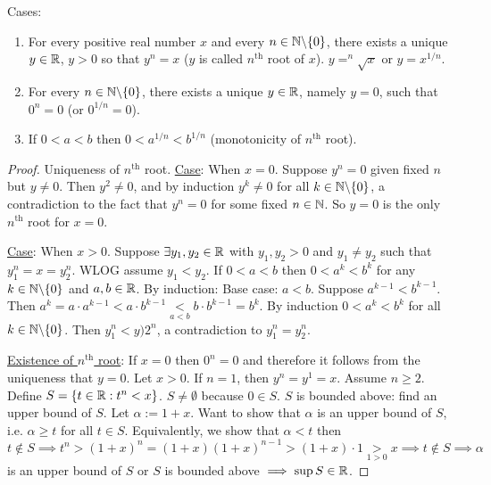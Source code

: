 \documentclass[]{article}
\begin{document}
\begin{theorem}
	Cases:
	\label{thm1.21}
	\begin{enumerate}
		\item For every positive real number $x$ and every $n\in\mathbb{N}\backslash \{0\}$, there exists a unique $y\in\mathbb{R}$, $y>0$ so that $y^n = x$ ($y$ is called $n^\text{th}$ root of $x$). $y = ^n\sqrt{x}$ or $y = x^{1/n}$.
		\item For every $n\in\mathbb{N}\backslash \{0\}$, there exists a unique $y\in\mathbb{R}$, namely \ul{$y=0$}, such that $0^n = 0$ (or $0^{1/n} = 0$).
		\item If $0<a<b$ then $0<a^{1/n} < b^{1/n}$ (monotonicity of $n^\text{th}$ root).
	\end{enumerate}
\end{theorem}
\begin{proof}
	Uniqueness of $n^\text{th}$ root.	
	\ul{Case}: When $x=0$. Suppose $y^n = 0$ given fixed $n$ but $y\neq 0$. Then $y^2 \neq 0$, and by induction $y^k \neq 0$ for all $k\in \mathbb{N}\backslash\{0\}$, a contradiction to the fact that $y^n = 0$ for some fixed $n\in\mathbb{N}$. So $y=0$ is the only $n^\text{th}$ root for $x=0$.
	
	\ul{Case}: When $x>0$. Suppose $\exists y_1,y_2\in\mathbb{R}$ with $y_1,y_2>0$ and $y_1\neq y_2$ such that $y_1^n = x = y_2^n$. WLOG assume $y_1<y_2$. If $0<a<b$ then $0<a^k<b^k$ for any $k\in\mathbb{N}\backslash \{0\}$ and $a,b\in\mathbb{R}$. By induction: Base case: $a<b$. Suppose $a^{k-1} < b^{k-1}$. Then $a^k = a\cdot a^{k-1} < a\cdot b^{k-1} \underset{a<b}{<} b\cdot b^{k-1} = b^k$. By induction $0<a^k<b^k$ for all $k\in\mathbb{N}\backslash \{0\}$. Then $y_1^n<y)2^n$, a contradiction to $y_1^n = y_2^n$.
	
	\ul{Existence of $n^\text{th}$ root}: If $x=0$ then $0^n = 0$ and therefore it follows from the uniqueness that $y=0$. Let $x>0$. If $n=1$, then $y^n = y^1 = x$. Assume $n\geq 2$. Define $S = \{t\in\mathbb{R}: t^n < x\}$. $S\neq \emptyset$ because $0\in S$. $S$ is bounded above: find an upper bound of $S$. Let $\alpha := 1+x$. Want to show that $\alpha$ is an upper bound of $S$, i.e. $\alpha \geq t$ for all $t\in S$. Equivalently, we show that $\alpha < t$ then $t\notin S \implies t^n > (1+x)^n = (1+x)(1+x)^{n-1} > (1+x)\cdot 1 \underset{1>0}{>} x \implies t\notin S \implies \alpha$ is an upper bound of $S$ or $S$ is bounded above $\implies \sup S\in \mathbb{R}$.
\end{proof}

\end{document}
